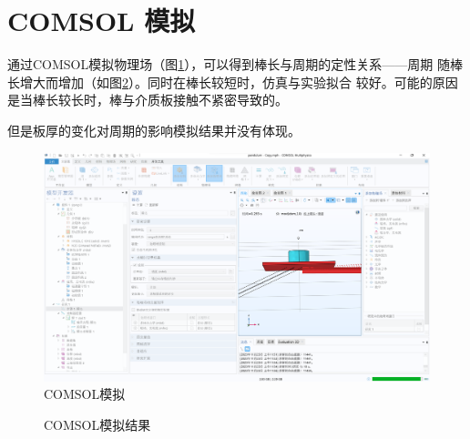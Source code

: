 \documentclass[AutoFakeBold]{LZUThesis}
\begin{document}
\section{COMSOL 模拟}
通过COMSOL模拟物理场（图\ref{COMSOL}），可以得到棒长与周期的定性关系——周期
随棒长增大而增加（如图\ref{COMSOL结果}）。同时在棒长较短时，仿真与实验拟合
较好。可能的原因是当棒长较长时，棒与介质板接触不紧密导致的。

但是板厚的变化对周期的影响模拟结果并没有体现。


\begin{figure}[H]
    \centering
    \includegraphics[width=12cm]{figures/COMSOL.png}
    \caption{COMSOL模拟}
    \label{COMSOL}
\end{figure}


\begin{figure}[H]
    \centering
    \caption{COMSOL模拟结果}
    \label{COMSOL结果}
\end{figure}
\end{document}
